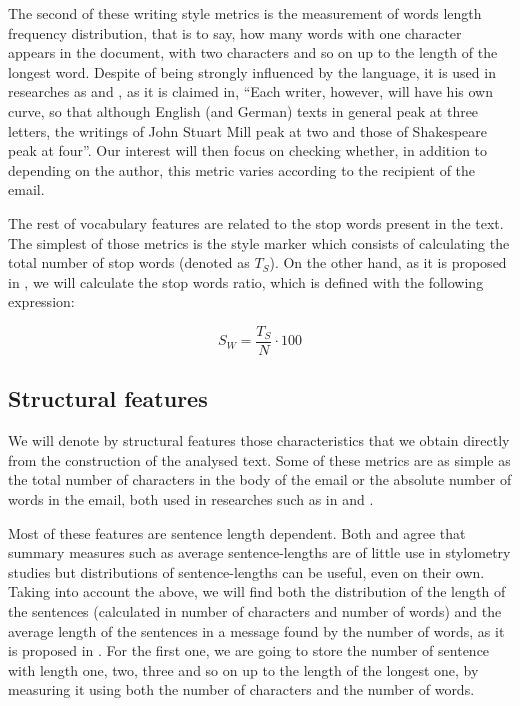 The second of these writing style metrics is the measurement of words length frequency distribution, that is to say, how many words with one character appears in the document, with two characters and so on up to the length of the longest word. Despite of being strongly influenced by the language, it is used in researches as \cite{corney2001identifying} and \cite{kemp1976personal}, as it is claimed in\cite{allen1974methods}, ``Each writer, however, will have his own curve, so that although English (and German) texts in general peak at three letters, the writings of John Stuart Mill peak at two and those of Shakespeare peak at four''. Our interest will then focus on checking whether, in addition to depending on the author, this metric varies according to the recipient of the email.

The rest of vocabulary features are related to the stop words present in the text. The simplest of those metrics is the style marker which consists of calculating the total number of stop words (denoted as $T_S$). On the other hand, as it is proposed in \cite{ril2014determination},  we will calculate the stop words ratio, which is defined with the following expression:

$$
S_W = \frac{T_S}{N}\cdot 100
$$

\subsection{Structural features}\label{ssect:strucf}

We will denote by structural features those characteristics that we obtain directly from the construction of the analysed text. Some of these metrics are as simple as the total number of characters in the body of the email or the absolute number of words in the email, both used in researches such as in \cite{corney2001identifying} and \cite{ril2014determination}.

Most of these features are sentence length dependent. Both \cite{tallentire1972appraisal} and \cite{kjetsaa1979and} agree that summary measures such as average sentence-lengths are of little use in stylometry studies but distributions of sentence-lengths can be useful, even on their own. Taking into account the above, we will find both the distribution of the length of the sentences (calculated in number of characters and number of words) and the average length of the sentences in a message found by the number of words, as it is proposed in \cite{corney2001identifying}. For the first one, we are going to store the number of sentence with length one, two, three and so on up to the length of the longest one, by measuring it  using both the number of characters and the number of words.
